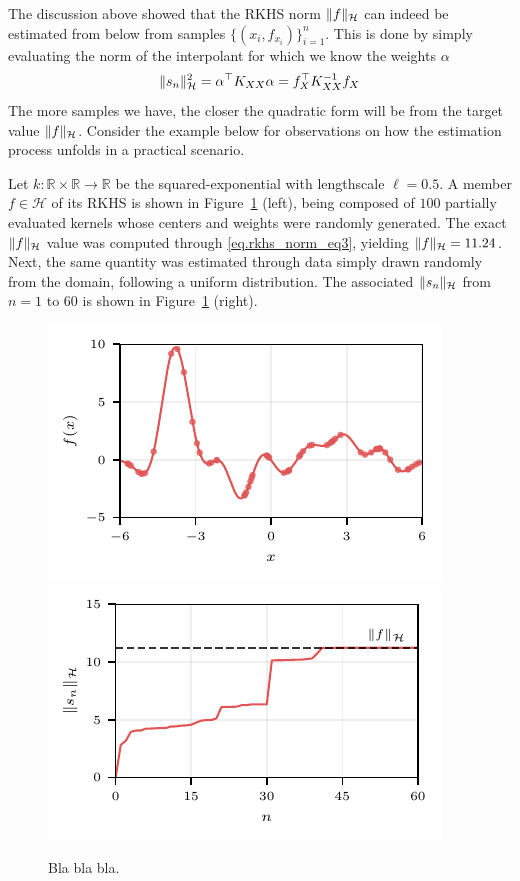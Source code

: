 The discussion above showed that the RKHS norm $\Vert f \Vert_{\mathcal{H}}$ can indeed be estimated from below from samples $\{(x_i,f_{x_i})\}_{i=1}^n$. This is done by simply evaluating the norm of the interpolant for which we know the weights $\alpha$
\begin{equation}
\Vert s_n \Vert_{\mathcal{H}}^2 = \alpha^\top K_{XX} \alpha = f_{X}^\top K_{XX}^{-1} f_{X}
\end{equation}
The more samples we have, the closer the quadratic form will be from the target value $\Vert f \Vert_{\mathcal{H}}$. Consider the example below for observations on how the estimation process unfolds in a practical scenario.

Let $k:\mathbb{R}\times \mathbb{R} \rightarrow \mathbb{R}$ be the squared-exponential with lengthscale $\ell = 0.5$. A member $f \in \mathcal{H}$ of its RKHS is shown in Figure~\ref{fig.appendice_norm_estimation} (left), being composed of $100$ partially evaluated kernels whose centers and weights were randomly generated. The exact $\Vert f\Vert_{\mathcal{H}}$ value was computed through \eqref{eq.rkhs_norm_eq3}, yielding $\Vert f\Vert_{\mathcal{H}} = 11.24$. Next, the same quantity was estimated through data simply drawn randomly from the domain, following a uniform distribution. The associated $\Vert s_n \Vert_{\mathcal{H}}$ from $n=1$ to $60$ is shown in Figure~\ref{fig.appendice_norm_estimation} (right).

\begin{figure}[b]
	\centering
	\includegraphics[scale=1]{../images/norm_est.pdf} 
	\includegraphics[scale=1]{../images/norm_value.pdf} %
	\caption{Bla bla bla.}
	\label{fig.appendice_norm_estimation}
\end{figure}


